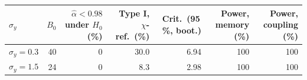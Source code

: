 \begin{tabular}{lrrrrrr}
\toprule
$\sigma_y$ & $B_0$ & $\hat\alpha<0.98$ under $H_0$ (\%) & Type I, $\chi$-ref.\ (\%) & Crit.\ (95\,\%, boot.) & Power, memory (\%) & Power, coupling (\%)\\
\midrule
$\sigma_y=0.3$ & 40 & 0 & 30.0 & 6.94 & 100 & 100\\
$\sigma_y=1.5$ & 24 & 0 & 8.3 & 2.98 & 100 & 100\\
\bottomrule
\end{tabular}
